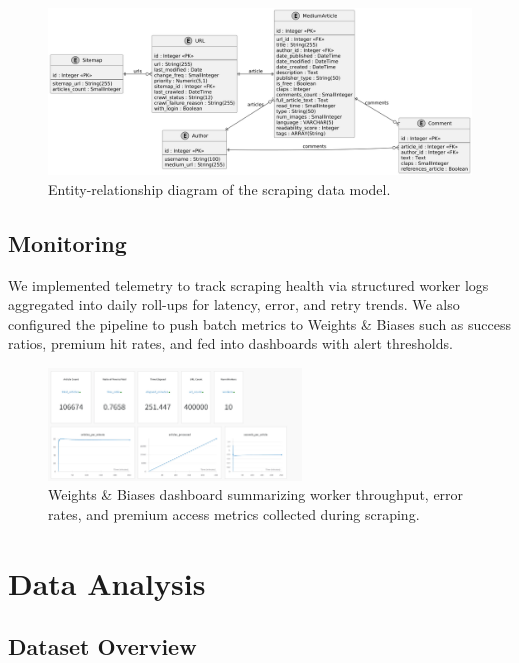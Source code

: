 \documentclass[11pt,a4paper]{article}
\begin{document}
\begin{figure}[H]
    \centering
    \includegraphics[width=\textwidth]{images/ER.png}
    \caption{Entity-relationship diagram of the scraping data model.}
\end{figure}

\subsection{Monitoring}

We implemented telemetry to track scraping health via structured worker logs aggregated into daily roll-ups for latency, error, and retry trends. We also configured the pipeline to push batch metrics to Weights \& Biases such as success ratios, premium hit rates, and fed into dashboards with alert thresholds.

\begin{figure}[H]
    \centering
    \includegraphics[width=0.6\textwidth]{images/weights_and_biases.png}
    \caption{Weights \& Biases dashboard summarizing worker throughput, error rates, and premium access metrics collected during scraping.}
    \label{fig:wandb_dashboard}
\end{figure}

\newpage

\section{Data Analysis}

\subsection{Dataset Overview}
\end{document}
